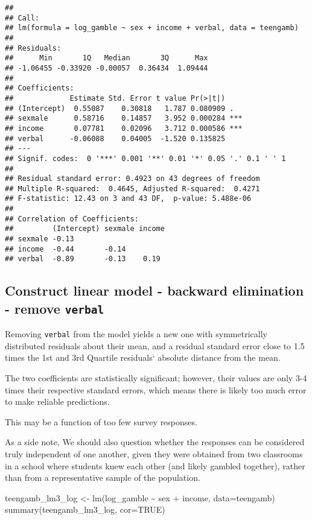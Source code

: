 \documentclass[
]{article}
\newenvironment{Shaded}{\begin{snugshade}}{\end{snugshade}}
\newcommand{\AttributeTok}[1]{\textcolor[rgb]{0.77,0.63,0.00}{#1}}
\newcommand{\ConstantTok}[1]{\textcolor[rgb]{0.00,0.00,0.00}{#1}}
\newcommand{\FunctionTok}[1]{\textcolor[rgb]{0.00,0.00,0.00}{#1}}
\newcommand{\NormalTok}[1]{#1}
\newcommand{\OtherTok}[1]{\textcolor[rgb]{0.56,0.35,0.01}{#1}}
\newcommand{\SpecialCharTok}[1]{\textcolor[rgb]{0.00,0.00,0.00}{#1}}
\begin{document}
\begin{verbatim}
## 
## Call:
## lm(formula = log_gamble ~ sex + income + verbal, data = teengamb)
## 
## Residuals:
##      Min       1Q   Median       3Q      Max 
## -1.06455 -0.33920 -0.00057  0.36434  1.09444 
## 
## Coefficients:
##             Estimate Std. Error t value Pr(>|t|)    
## (Intercept)  0.55087    0.30818   1.787 0.080909 .  
## sexmale      0.58716    0.14857   3.952 0.000284 ***
## income       0.07781    0.02096   3.712 0.000586 ***
## verbal      -0.06088    0.04005  -1.520 0.135825    
## ---
## Signif. codes:  0 '***' 0.001 '**' 0.01 '*' 0.05 '.' 0.1 ' ' 1
## 
## Residual standard error: 0.4923 on 43 degrees of freedom
## Multiple R-squared:  0.4645, Adjusted R-squared:  0.4271 
## F-statistic: 12.43 on 3 and 43 DF,  p-value: 5.488e-06
## 
## Correlation of Coefficients:
##         (Intercept) sexmale income
## sexmale -0.13                     
## income  -0.44       -0.14         
## verbal  -0.89       -0.13    0.19
\end{verbatim}

\hypertarget{construct-linear-model---backward-elimination---remove-verbal}{%
\subsection{\texorpdfstring{Construct linear model - backward
elimination - remove
\texttt{verbal}}{Construct linear model - backward elimination - remove verbal}}\label{construct-linear-model---backward-elimination---remove-verbal}}

Removing \texttt{verbal} from the model yields a new one with
symmetrically distributed residuals about their mean, and a residual
standard error close to 1.5 times the 1st and 3rd Quartile residuals`
absolute distance from the mean.

The two coefficients are statistically significant; however, their
values are only 3-4 times their respective standard errors, which means
there is likely too much error to make reliable predictions.

This may be a function of too few survey responses.

As a side note, We should also question whether the responses can be
considered truly independent of one another, given they were obtained
from two classrooms in a school where students knew each other (and
likely gambled together), rather than from a representative sample of
the population.

\begin{Shaded}
\begin{Highlighting}[]
\NormalTok{teengamb\_lm3\_log }\OtherTok{\textless{}{-}} \FunctionTok{lm}\NormalTok{(log\_gamble }\SpecialCharTok{\textasciitilde{}}\NormalTok{ sex }\SpecialCharTok{+}\NormalTok{ income, }\AttributeTok{data=}\NormalTok{teengamb)}
\FunctionTok{summary}\NormalTok{(teengamb\_lm3\_log, }\AttributeTok{cor=}\ConstantTok{TRUE}\NormalTok{)}
\end{Highlighting}
\end{Shaded}
\end{document}
